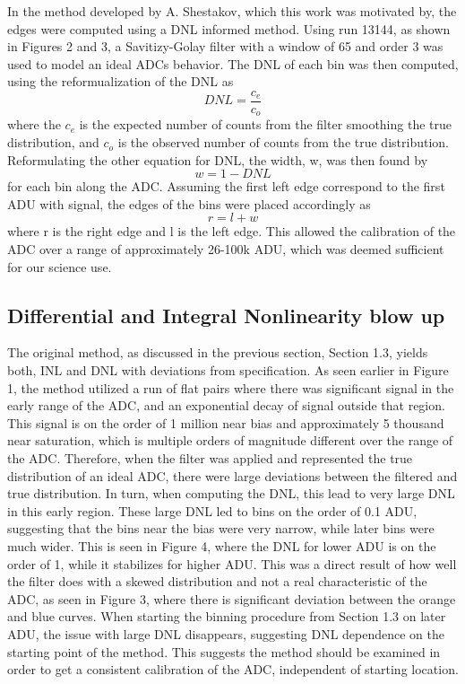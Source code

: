 \documentclass[11pt, letterpaper]{article}
\begin{document}
In the method developed by A. Shestakov, which this work was motivated by, the edges were computed using a DNL informed method. 
Using run 13144, as shown in Figures 2 and 3, a Savitizy-Golay filter with a window of 65 and order 3 was used to model an ideal ADCs behavior. 
The DNL of each bin was then computed, using the reformualization of the DNL as 
 \begin{equation}\label{}
 DNL = \frac{c_e}{c_o}
 \end{equation}
where the $c_{e}$ is the expected number of counts from the filter smoothing the true distribution, and $c_{o}$ is the observed number of counts from the true distribution. 
Reformulating the other equation for DNL, the width, w, was then found by
 \begin{equation}\label{}
 w = 1-DNL
 \end{equation}
for each bin along the ADC. 
Assuming the first left edge correspond to the first ADU with signal, the edges of the bins were placed accordingly as
 \begin{equation}\label{}
r = l + w 
\end{equation}
where r is the right edge and l is the left edge. 
This allowed the calibration of the ADC over a range of approximately 26-100k ADU, which was deemed sufficient for our science use. 


\subsection{Differential and Integral Nonlinearity blow up}
\indent


The original method, as discussed in the previous section, Section 1.3, yields both, INL and DNL with deviations from specification. 
As seen earlier in Figure 1, the method utilized a run of flat pairs where there was significant signal in the early range of the ADC, and an exponential decay of signal outside that region. 
This signal is on the order of 1 million near bias and approximately 5 thousand near saturation, which is multiple orders of magnitude different over the range of the ADC. 
Therefore, when the filter was applied and represented the true distribution of an ideal ADC, there were large deviations between the filtered and true distribution. 
In turn, when computing the DNL, this lead to very large DNL in this early region. 
These large DNL led to bins on the order of 0.1 ADU, suggesting that the bins near the bias were very narrow, while later bins were much wider. 
This is seen in Figure 4, where the DNL for lower ADU is on the order of 1, while it stabilizes for higher ADU. 
This was a direct result of how well the filter does with a skewed distribution and not a real characteristic of the ADC, as seen in Figure 3, where there is significant deviation between the orange and blue curves. 
When starting the binning procedure from Section 1.3 on later ADU, the issue with large DNL disappears, suggesting DNL dependence on the starting point of the method. 
This suggests the method should be examined in order to get a consistent calibration of the ADC, independent of starting location.
\indent 
\end{document}
